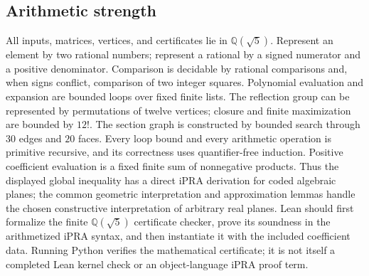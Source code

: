 \subsection{Arithmetic strength}
All inputs, matrices, vertices, and certificates lie in
$\mathbb Q(\sqrt5)$. Represent an element by two rational numbers; represent
a rational by a signed numerator and a positive denominator. Comparison
is decidable by rational comparisons and, when signs conflict, comparison
of two integer squares. Polynomial evaluation and expansion are bounded
loops over fixed finite lists. The reflection group can be represented
by permutations of twelve vertices; closure and finite maximization
are bounded by $12!$. The section graph is constructed by bounded
search through $30$ edges and $20$ faces. Every loop bound and every
arithmetic operation is primitive recursive, and its correctness uses
quantifier-free induction. Positive coefficient evaluation is a fixed
finite sum of nonnegative products. Thus the displayed global inequality
has a direct iPRA derivation for coded algebraic planes; the common
geometric interpretation and approximation lemmas handle the chosen
constructive interpretation of arbitrary real planes. Lean should first
formalize the finite $\mathbb Q(\sqrt5)$ certificate checker, prove its
soundness in the arithmetized iPRA syntax, and then instantiate it with
the included coefficient data. Running Python verifies the mathematical
certificate; it is not itself a completed Lean kernel check or an
object-language iPRA proof term.
